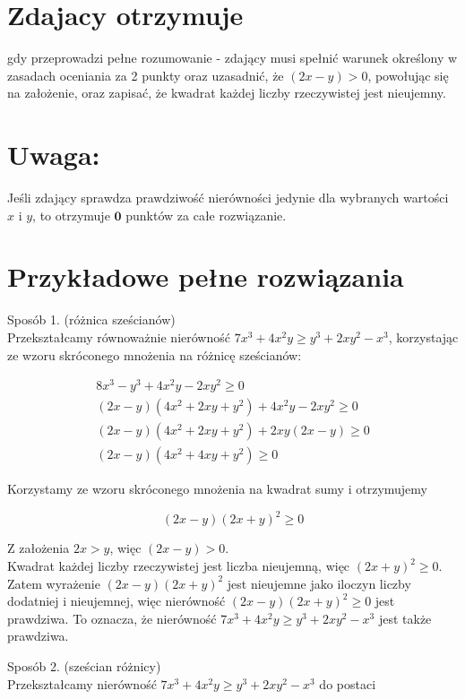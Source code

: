 \documentclass[10pt]{article}
\begin{document}
\section*{Zdajacy otrzymuje}
gdy przeprowadzi pełne rozumowanie - zdający musi spełnić warunek określony w zasadach oceniania za 2 punkty oraz uzasadnić, że $(2 x-y)>0$, powołując się na założenie, oraz zapisać, że kwadrat każdej liczby rzeczywistej jest nieujemny.

\section*{Uwaga:}
Jeśli zdający sprawdza prawdziwość nierówności jedynie dla wybranych wartości $x$ i $y$, to otrzymuje $\mathbf{0}$ punktów za całe rozwiązanie.

\section*{Przykładowe pełne rozwiązania}
Sposób 1. (różnica sześcianów)\\
Przekształcamy równoważnie nierówność $7 x^{3}+4 x^{2} y \geq y^{3}+2 x y^{2}-x^{3}$, korzystając ze wzoru skróconego mnożenia na różnicę sześcianów:

$$
\begin{gathered}
8 x^{3}-y^{3}+4 x^{2} y-2 x y^{2} \geq 0 \\
(2 x-y)\left(4 x^{2}+2 x y+y^{2}\right)+4 x^{2} y-2 x y^{2} \geq 0 \\
(2 x-y)\left(4 x^{2}+2 x y+y^{2}\right)+2 x y(2 x-y) \geq 0 \\
(2 x-y)\left(4 x^{2}+4 x y+y^{2}\right) \geq 0
\end{gathered}
$$

Korzystamy ze wzoru skróconego mnożenia na kwadrat sumy i otrzymujemy

$$
(2 x-y)(2 x+y)^{2} \geq 0
$$

Z założenia $2 x>y$, więc $(2 x-y)>0$.\\
Kwadrat każdej liczby rzeczywistej jest liczba nieujemną, więc $(2 x+y)^{2} \geq 0$.\\
Zatem wyrażenie $(2 x-y)(2 x+y)^{2}$ jest nieujemne jako iloczyn liczby dodatniej i nieujemnej, więc nierówność $(2 x-y)(2 x+y)^{2} \geq 0$ jest prawdziwa. To oznacza, że nierówność $7 x^{3}+4 x^{2} y \geq y^{3}+2 x y^{2}-x^{3}$ jest także prawdziwa.

Sposób 2. (sześcian różnicy)\\
Przekształcamy nierówność $7 x^{3}+4 x^{2} y \geq y^{3}+2 x y^{2}-x^{3}$ do postaci
\end{document}
